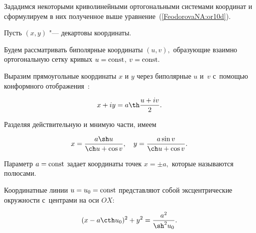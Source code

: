 Зададимся некоторыми криволинейными ортогональными системами координат и сформулируем в них полученное выше уравнение~(\ref{FeodorovaNA:or10d}).



\smallskip


Пусть $(x,y)$ "--- декартовы координаты. 

Будем рассматривать биполярные координаты $(u,v),$ образующие взаимно ортогональную сетку кривых $u=\rm const$, $v=\rm const.$

Выразим прямоугольные координаты $x$ и $y$ через биполярные $u$ и~$v$ с~помощью конформного отображения~\cite{FeodorovaNA:Lavr}:







$$x+iy=a\th \frac{u+iv}{2}.

$$









\noindent

Разделяя действительную и мнимую части, имеем







\begin{equation}

\label{FeodorovaNA:or1} x=\frac{a\sh u}{\ch u+\cos

v}, \quad y=\frac{a\sin v}{\ch u+\cos v}.

\end{equation}









\noindent 

Параметр $a=\rm const$ задает координаты точек $x=\pm a,$ которые называются полюсами. 

Координатные линии $u=u_0=\rm const$ представляют собой эксцентрические окружности с~центрами на оси $OX$:

\begin{equation}

\label{FeodorovaNA:or2} 

(x-a\cth u_0)^2+y^2=\frac{a^2}{\sh^2 u_0}.

\end{equation}





